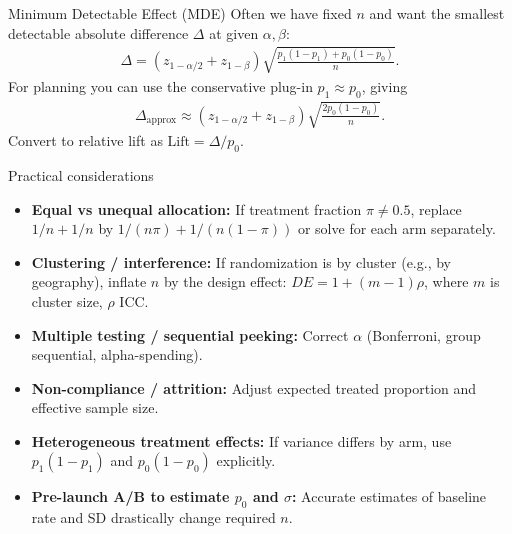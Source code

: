 \documentclass[aspectratio=169,11pt]{beamer}
\begin{document}
\begin{frame}{Minimum Detectable Effect (MDE)}
  Often we have fixed $n$ and want the smallest detectable absolute difference $\Delta$ at given $\alpha, \beta$:
  \begin{align*}
    \Delta = (z_{1-\alpha/2} + z_{1-\beta}) \sqrt{\frac{p_1(1-p_1)+p_0(1-p_0)}{n}}.
  \end{align*}
  For planning you can use the conservative plug-in $p_1\approx p_0$, giving
  \begin{align*}
    \Delta_{\text{approx}} \approx (z_{1-\alpha/2} + z_{1-\beta}) \sqrt{\frac{2 p_0(1-p_0)}{n}}.
  \end{align*}
  Convert to relative lift as $\text{Lift} = \Delta / p_0$.
\end{frame}

\begin{frame}{Practical considerations}
  \begin{itemize}
    \item \textbf{Equal vs unequal allocation:} If treatment fraction $\pi \ne 0.5$, replace $1/n+1/n$ by $1/(n\pi)+1/(n(1-\pi))$ or solve for each arm separately.
    \item \textbf{Clustering / interference:} If randomization is by cluster (e.g., by geography), inflate $n$ by the design effect: $DE = 1 + (m-1)\rho$, where $m$ is cluster size, $\rho$ ICC.
    \item \textbf{Multiple testing / sequential peeking:} Correct $\alpha$ (Bonferroni, group sequential, alpha-spending).
    \item \textbf{Non-compliance / attrition:} Adjust expected treated proportion and effective sample size.
    \item \textbf{Heterogeneous treatment effects:} If variance differs by arm, use $p_1(1-p_1)$ and $p_0(1-p_0)$ explicitly.
    \item \textbf{Pre-launch A/B to estimate $p_0$ and $\sigma$:} Accurate estimates of baseline rate and SD drastically change required $n$.
  \end{itemize}
\end{frame}
\end{document}

